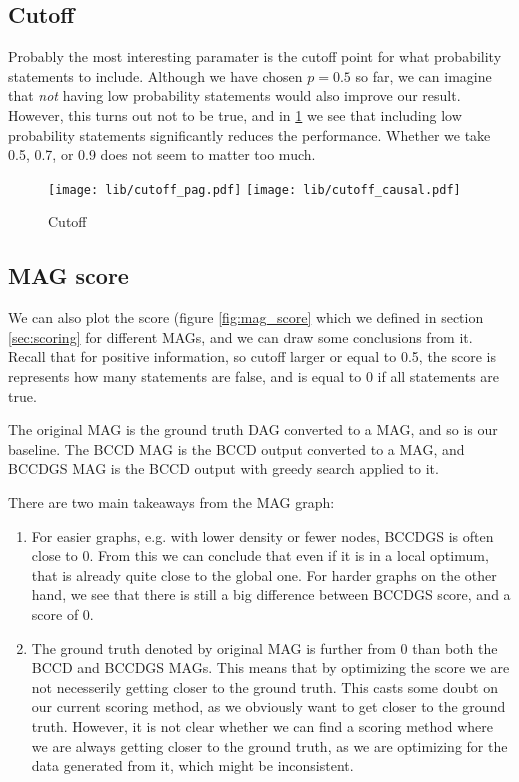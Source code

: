 \documentclass[11pt,a4paper]{report}
\theoremstyle{definition}
\begin{document}
\subsection{Cutoff}
Probably the most interesting paramater is the cutoff point for what
probability statements to include. Although we have chosen $p=0.5$ so far,
we can imagine that \emph{not} having low probability statements would
also improve our result. However, this turns out not to be true, and in
\ref{fig:cutoff_causal} we see that including low probability statements
significantly reduces the performance. Whether we take 0.5, 0.7, or 0.9
does not seem to matter too much.
\begin{figure}
  \centering
  \texttt{[image: lib/cutoff\_pag.pdf]}
  \texttt{[image: lib/cutoff\_causal.pdf]}
  \caption{Cutoff}
  \label{fig:cutoff_causal}
\end{figure}

\subsection{MAG score}
We can also plot the score (figure \ref{fig:mag_score} which we defined in
section \ref{sec:scoring} for different MAGs, and we can draw some
conclusions from it. Recall that for positive information, so cutoff
larger or equal to 0.5, the score is represents how many statements are
false, and is equal to 0 if all statements are true.

The original MAG is the ground truth DAG converted to a MAG, and so is our
baseline. The BCCD MAG is the BCCD output converted to a MAG, and BCCDGS
MAG is the BCCD output with greedy search applied to it. 

There are two main takeaways from the MAG graph:
\begin{enumerate}
  \item For easier graphs, e.g. with lower density or fewer nodes, BCCDGS
    is often close to 0. From this we can conclude that even if it is in a
    local optimum, that is already quite close to the global one.
    For harder graphs on the other hand, we see that there is still a big
    difference between BCCDGS score, and a score of 0.

  \item The ground truth denoted by original MAG is further from 0 than
    both the BCCD and BCCDGS MAGs. This means that by optimizing the score
    we are not necesserily getting closer to the ground truth. This casts
    some doubt on our current scoring method, as we obviously want to get
    closer to the ground truth. However, it is not clear whether we can
    find a scoring method where we are always getting closer to the ground
    truth, as we are optimizing for the data generated from it, which
    might be inconsistent.

\end{enumerate}
\end{document}

